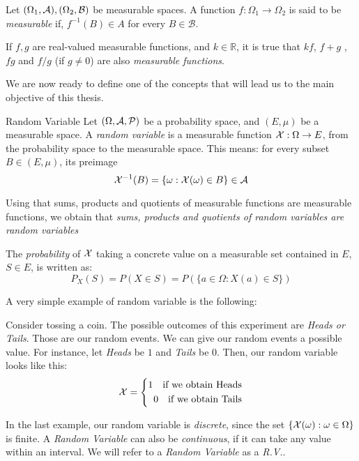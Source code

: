 \begin{ndef}
Let $(\Omega_1, \mathcal{A}),(\Omega_2, \mathcal B)$ be measurable spaces. A function $f: \Omega_1 \to \Omega_2$ is said to be \emph{measurable} if, $f^{-1}(B) \in A$ for every $B \in \mathcal B$.
\end{ndef}

If $f,g$ are real-valued measurable functions, and $k \in \mathbb R$, it is true that $kf$, $f+g$ , $fg$ and $f/g$ (if $g \ne 0$) are also \emph{measurable functions}.

We are now ready to define one of the concepts that will lead us to the main objective of this thesis.

\begin{ndef}{Random Variable}
Let $(\Omega,\mathcal{A},\mathcal{P})$ be a probability space, and $(E,\mu)$ be a measurable space. 
A \emph{random variable} is a measurable function $\mathcal{X}: \Omega \to E$, from the probability space to the measurable space. This means: for every subset $B \in (E,\mu)$, its preimage
$$
\mathcal{X}^{-1}(B) = \{\omega : \mathcal{X}(\omega) \in B\} \in \mathcal{A}
$$
\end{ndef}

Using that sums, products and quotients of measurable functions are measurable functions, we obtain that \emph{sums, products and quotients of random variables are random variables}

The \emph{probability} of $\mathcal{X}$ taking a concrete value on a measurable set contained in $E$, $S \in E$, is written as:
$$
P_X(S) = P(X \in S) = P(\{a \in \Omega : X(a) \in S\})
$$

A very simple example of random variable is the following:

\begin{nexample}
  Consider tossing a coin. The possible outcomes of this experiment are \emph{Heads or Tails}. Those are our random events. We can give our random events a possible value. For instance, let \emph{Heads} be $1$ and \emph{Tails} be 0. Then, our random variable looks like this:
  \begin{equation*}
      \mathcal {\mathcal{X}}  = \left\{ \begin{aligned}
  1 \quad \text{if we obtain Heads} \\
  0 \quad \text{if we obtain Tails}
\end{aligned}\right.
  \end{equation*}

\end{nexample}

In the last example, our random variable is \emph{discrete}, since the set $\{\mathcal{X}(\omega): \omega \in \Omega\}$ is finite. A \emph{Random Variable} can also be \emph{continuous}, if it can take any value within an interval.
We will refer to a \emph{Random Variable} as a \emph{R.V.}. \\

